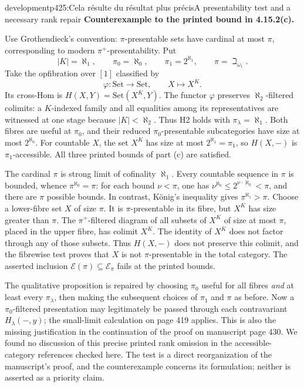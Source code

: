 \begin{dcomment}{development}{p425:Cela résulte du résultat plus précis}{A presentability test and a necessary rank repair}
\textbf{Counterexample to the printed bound in 4.15.2(c).}\ours\ 

Use Grothendieck's convention: $\pi$-presentable sets have cardinal at most $\pi$, corresponding to modern $\pi^+$-presentability. Put
\[
 |K|=\aleph_1,\qquad
 \pi_0=\aleph_0,\qquad
 \pi_1=2^{\aleph_1},\qquad
 \pi=\beth_{\omega_1}.
\]
Take the opfibration over $[1]$ classified by
\[
 \varphi:\mathrm{Set}\to\mathrm{Set},\qquad X\longmapsto X^K.
\]
Its cross-Hom is $H(X,Y)=\mathrm{Set}(X^K,Y)$. The functor $\varphi$ preserves $\aleph_2$-filtered colimits: a $K$-indexed family and all equalities among its representatives are witnessed at one stage because $|K|<\aleph_2$. Thus H2 holds with $\pi_\lambda=\aleph_1$. Both fibres are useful at $\pi_0$, and their reduced $\pi_0$-presentable subcategories have size at most $2^{\aleph_0}$. For countable $X$, the set $X^K$ has size at most $2^{\aleph_1}=\pi_1$, so $H(X,-)$ is $\pi_1$-accessible. All three printed bounds of part (c) are satisfied.

The cardinal $\pi$ is strong limit of cofinality $\aleph_1$. Every countable sequence in $\pi$ is bounded, whence $\pi^{\aleph_0}=\pi$: for each bound $\nu<\pi$, one has $\nu^{\aleph_0}\leq2^{\nu\cdot\aleph_0}<\pi$, and there are $\pi$ possible bounds. In contrast, K\"onig's inequality gives $\pi^{\aleph_1}>\pi$. Choose a lower-fibre set $X$ of size $\pi$. It is $\pi$-presentable in its fibre, but $X^K$ has size greater than $\pi$. The $\pi^+$-filtered diagram of all subsets of $X^K$ of size at most $\pi$, placed in the upper fibre, has colimit $X^K$. The identity of $X^K$ does not factor through any of those subsets. Thus $H(X,-)$ does not preserve this colimit, and the fibrewise test proves that $X$ is not $\pi$-presentable in the total category. The asserted inclusion $\mathcal E(\pi)\subseteq\mathcal E_\pi$ fails at the printed bounds.

The qualitative proposition is repaired by choosing $\pi_0$ useful for all fibres \emph{and} at least every $\pi_\lambda$, then making the subsequent choices of $\pi_1$ and $\pi$ as before. Now a $\pi_0$-filtered presentation may legitimately be passed through each contravariant $H_\lambda(-,y)$; the small-limit calculation on page 419 applies. This is also the missing justification in the continuation of the proof on manuscript page 430. We found no discussion of this precise printed rank omission in the accessible-category references checked here. The test is a direct reorganization of the manuscript's proof, and the counterexample concerns its formulation; neither is asserted as a priority claim.
\end{dcomment}

